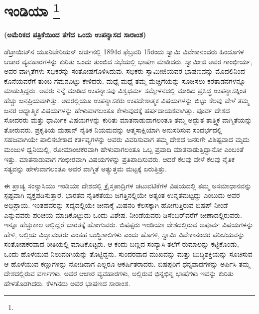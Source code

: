 
\chapter[ಇಂಡಿಯಾ ]{ಇಂಡಿಯಾ \protect\footnote{}}

\centerline{\textbf{(ಅಮೆರಿಕದ ಪತ್ರಿಕೆಯಿಂದ ತೆಗೆದ ಒಂದು ಉಪನ್ಯಾಸದ ಸಾರಾಂಶ)}}

ಡೆಟ್ರಾಯಿಟ್​ನ ಯೂನಿಟೇರಿಯನ್​ ಚರ್ಚಿನಲ್ಲಿ 1894ರ ಫೆಬ್ರವರಿ 15ರಂದು ಸ್ವಾಮಿ ವಿವೇಕಾನಂದರು ಹಿಂದೂಗಳ ಆಚಾರ ವ್ಯವಹಾರಗಳನ್ನು ಕುರಿತು ಒಂದು ತುಂಬಿದ ಸಭೆಯಲ್ಲಿ ಭಾಷಣ ಮಾಡಿದರು. ಸ್ವಾಮೀಜಿ ಅವರ ಗಾಂಭೀರ್ಯ, ಅವರ ವಾಗ್ಮಿತೆಗಳು ಸಭಿಕರನ್ನು ಸಂತೋಷಗೊಳಿಸಿದುವು. ಸಭಿಕರು ಸ್ವಾಮೀಜಿಯವರ ಭಾಷಣವನ್ನು ಮೊದಲಿನಿಂದ ಕೊನೆಯವರೆಗೆ ತುಂಬ ಗಮನವಿಟ್ಟು ಕೇಳಿದರು. ಮಧ್ಯೆ ಮಧ್ಯೆ ತಮ್ಮ ಮೆಚ್ಚಿಗೆಯನ್ನು ಸೂಚಿಸಲು ಕರತಾಡನಗಳನ್ನೂ ಮಾಡುತ್ತಿದ್ದರು. ಅವರು ನಿನ್ನೆ ಮಾಡಿದ ಉಪನ್ಯಾಸವು ವಿಶ್ವಧರ್ಮ ಸಮ್ಮೇಳನದಲ್ಲಿ ಮಾಡಿದ ಪ್ರಸಿದ್ಧ ಉಪನ್ಯಾಸಕ್ಕಿಂತ ಹೆಚ್ಚು ಜನಪ್ರಿಯವಾಗಿತ್ತು. ಅದರಲ್ಲಿಯೂ ಉಪನ್ಯಾಸಕರು ಉಪದೇಶಾತ್ಮಕ ವಿಷಯಗಳನ್ನು ಬಿಟ್ಟು ಕೆಲವು ವೇಳೆ ತಮ್ಮ ಜನರ ಆಧ್ಯಾತ್ಮಿಕ ವಿಷಯಗಳನ್ನು ಹೇಳುವಾಗಲಂತೂ ಕೇಳುವುದಕ್ಕೆ ಹರ್ಷದಾಯಕವಾಗಿತ್ತು. ಪೂರ್ವ ದೇಶದ ಸೋದರರು ಮತ್ತು ಧಾರ್ಮಿಕ ವಿಷಯಗಳನ್ನು ಕುರಿತು ಮಾತನಾಡುವಾಗಲಂತೂ ತಮ್ಮ ಅದ್ಭುತ ತಾತ್ತ್ವಿಕ ವಾಗ್ಮಿತೆಯನ್ನು ತೋರುವರು. ಪ್ರಕೃತಿಯ ಮಹಾನ್​ ನೈತಿಕ ನಿಯಮವನ್ನು ಆತ್ಮಸಾಕ್ಷಿಯಾಗಿ ಅನುಸರಿಸುವ ಸಂದರ್ಭದಲ್ಲಿ ಸಹಜವಾಗಿಯೇ ಪಾಲಿಸಬೇಕಾದ ಕರ್ತವ್ಯಗಳನ್ನು ಅವರು ವಿವರಿಸುವಾಗ ತಮ್ಮ ದೇಶದ ಜನರಿಗೇ ವಿಶಿಷ್ಟವಾದ ಮೃದು ಮಂಜುಳ ಧ್ವನಿಯಲ್ಲಿ, ರೋಮಾಂಚಕರವಾಗಿ ಹೇಳುವಾಗಲಂತೂ ಒಬ್ಬ ಪ್ರವಾದಿ ಮಾತನಾಡುತ್ತಿದ್ದಾನೋ ಎಂಬಂತೆ ಇತ್ತು. ಮಾತನಾಡುವಾಗ ಗಂಭೀರವಾಗಿ ವಿಷಯಗಳನ್ನು ಪ್ರತಿಪಾದಿಸುವರು. ಆದರೆ ಕೆಲವು ವೇಳೆ ಕೆಲವು ನೈತಿಕ ಸತ್ಯವನ್ನು ಹೇಳುವಾಗಲಂತೂ ಅವರ ವಾಗ್ಮಿತೆ ಅತ್ಯುತ್ತಮ ಮಟ್ಟಕ್ಕೆ ಏರುತ್ತಿತ್ತು.

ಈ ಪ್ರಾಚ್ಯ ಸಂನ್ಯಾಸಿಯು ಇಂಡಿಯಾ ದೇಶದಲ್ಲಿ ಕ್ರೈಸ್ತಪಾದ್ರಿಗಳ ಚಟುವಟಿಕೆಗಳ ವಿಷಯದಲ್ಲಿ ತಮ್ಮ ಅಸಮಾಧಾನವನ್ನು ಸ್ಪಷ್ಟವಾಗಿ ವ್ಯಕ್ತಪಡಿಸುತ್ತಾರೆ. ಭಾರತದ ನೈತಿಕತೆಯು ಜಗತ್ತಿನಲ್ಲಿಯೇ ಅತ್ಯಂತ ಉನ್ನತಮಟ್ಟದ್ದು ಎಂಬುದು ಅವರ ಅಭಿಪ್ರಾಯ. ಇಂತಹವರನ್ನು ಸದ್ಯದಲ್ಲಿಯೇ ಚೀನಾಕ್ಕೆ ಮಿಷನರಿ ಕೆಲಸಕ್ಕಾಗಿ ಹೋಗುತ್ತಿರುವ ಬಿಷಪ್​ ನೀಂಡೆ ಎನ್ನುವವರು ಪರಿಚಯ ಮಾಡಿಕೊಟ್ಟುದು ಒಂದು ವಿಶೇಷ. ನೀಂಡೆಯವರು ಡಿಸೆಂಬರ್​ವರೆಗೆ ಚೀಣಾದಲ್ಲಿರುವರು. ಇನ್ನೂ ಹೆಚ್ಚುಕಾಲ ಅಲ್ಲಿದ್ದರೆ ಭಾರತಕ್ಕೆ ಹೋಗುವರು. ಬಿಷಪ್ಪರು ಇಂಡಿಯಾ ದೇಶದಲ್ಲಿರುವ ಅಪೂರ್ವ ವಿಷಯಗಳನ್ನು ಹೇಳಿ, ಅಲ್ಲಿಯ ವಿದ್ಯಾವಂತರು ಎಂತಹ ಬುದ್ಧಿಶಾಲಿಗಳು ಎಂದು ಹೊಗಳಿ, ಸ್ವಾಮಿ ವಿವೇಕಾನಂದರ ಪರಿಚಯವನ್ನು ಸಂತೋಷಕರವಾದ ರೀತಿಯಲ್ಲಿ ಮಾಡಿಕೊಟ್ಟರು. ಆ ಕಂದು ಬಣ್ಣದ ಸಂನ್ಯಾಸಿ ತಲೆಗೆ ರುಮಾಲನ್ನು ಕಟ್ಟಿಕೊಂಡು, ಒಂದು ಹೊಳೆಯುವ ನಿಲುವಂಗಿಯನ್ನು ತೊಟ್ಟಿದ್ದನು. ಸುಂದರವಾದ ಮುಖವನ್ನು ಮತ್ತು ಬುದ್ಧಿಶಕ್ತಿಯನ್ನು ಸೂಚಿಸುವ ಆ ಹೊಳೆಯುವ ಕಣ್ಣುಗಳನ್ನು ನೋಡಿದಾಗ ಎಲ್ಲರೂ ಆಕರ್ಷಿತರಾದರು. ಬಿಷಪ್ಪರಿಗೆ ಧನ್ಯವಾದಗಳನ್ನು ಅರ್ಪಿಸಿ ತಮ್ಮ ದೇಶದಲ್ಲಿರುವ ವರ್ಣಗಳು, ಅವರ ಆಚಾರ ವ್ಯವಹಾರಗಳು, ಅಲ್ಲಿರುವ ಭಿನ್ನಭಿನ್ನ ಭಾಷೆಗಳು ಇವನ್ನು ಕುರಿತು ಹೇಳತೊಡಗಿದರು. ಕೆಳಗಿನದು ಅವರ ಭಾಷಣದ ಸಾರಾಂಶ.


